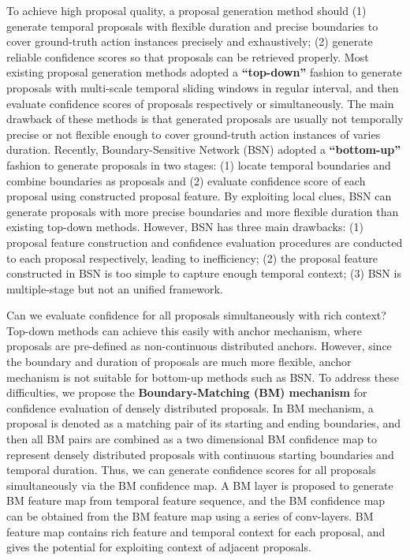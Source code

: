 \documentclass[10pt,twocolumn,letterpaper]{article}
\begin{document}
To achieve high proposal quality, a proposal generation method should (1) generate temporal proposals with flexible duration and precise boundaries to cover ground-truth action instances precisely and exhaustively; (2) generate reliable confidence scores so that proposals can be retrieved properly.
%
Most existing proposal generation methods \cite{sst_buch_cvpr17,fast_temporal_activity_cvpr16,escorcia2016daps,shou2016action} adopted a \textbf{``top-down''} fashion to generate proposals with multi-scale temporal sliding windows in regular interval, and then evaluate confidence scores of proposals respectively or simultaneously.
%
The main drawback of these methods is that generated proposals are usually not temporally precise or not flexible enough to cover  ground-truth action instances of varies duration.
%
Recently, Boundary-Sensitive Network (BSN) \cite{lin2018bsn} adopted a \textbf{``bottom-up''} fashion to generate proposals in two stages:  (1) locate temporal boundaries and combine boundaries as proposals and (2) evaluate confidence score of each proposal using constructed proposal feature. 
%
By exploiting local clues, BSN can generate proposals with  more precise boundaries and more  flexible duration than existing top-down methods.
%
However, BSN has three main drawbacks: (1) proposal feature construction and confidence evaluation procedures are conducted to each proposal respectively, leading to inefficiency;
%
(2) the proposal feature constructed in BSN is too simple to capture enough temporal context;
%
(3) BSN is multiple-stage but not an unified framework.


Can we evaluate confidence for all proposals simultaneously with rich context?
%
Top-down methods \cite{ssad,sstad} can achieve this easily with anchor mechanism, where proposals are pre-defined as non-continuous distributed anchors.
%
However, since the boundary and duration of proposals are much more flexible, anchor mechanism is not suitable for bottom-up methods such as BSN. 
%
To address these difficulties, we propose the \textbf{Boundary-Matching (BM) mechanism} for  confidence evaluation of densely distributed proposals. In BM mechanism, a proposal is denoted as a matching pair of its starting and ending boundaries, and then all BM pairs are combined  as a two dimensional BM confidence map to represent densely distributed proposals with continuous starting boundaries and temporal duration.
%
Thus, we can generate confidence scores for all proposals simultaneously via the BM confidence map.
%
A BM layer is proposed to generate BM feature map from temporal feature sequence, and the BM confidence map can be obtained from the BM feature map using a series of conv-layers. BM feature map contains rich feature and temporal context for each proposal, and gives the potential for exploiting context of adjacent proposals.
\end{document}
